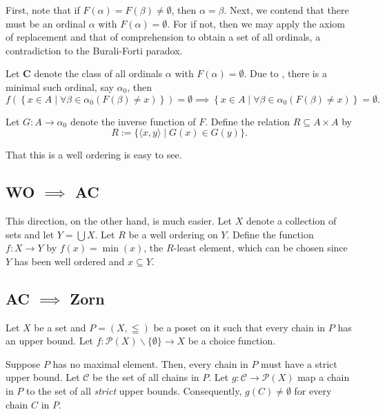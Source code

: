 First, note that if $F(\alpha) = F(\beta)\ne\emptyset$, then $\alpha = \beta$. Next, we contend that there must be an ordinal $\alpha$ with $F(\alpha) = \emptyset$. For if not, then we may apply the axiom of replacement and that of comprehension to obtain a set of all ordinals, a contradiction to the Burali-Forti paradox.

Let $\mathbf C$ denote the class of all ordinals $\alpha$ with $F(\alpha) = \emptyset$. Due to , there is a minimal such ordinal, say $\alpha_0$, then 
\begin{equation*}
    f\left(\left\{x\in A\mid\forall\beta\in\alpha_0(F(\beta)\ne x)\right\}\right) = \emptyset\implies\left\{x\in A\mid\forall\beta\in\alpha_0(F(\beta)\ne x)\right\} = \emptyset.
\end{equation*}

Let $G: A\to\alpha_0$ denote the inverse function of $F$. Define the relation $R\subseteq A\times A$ by 
\begin{equation*}
    R := \{\langle x,y\rangle\mid G(x)\in G(y)\}.
\end{equation*}

That this is a well ordering is easy to see.

\subsection*{WO \texorpdfstring{$\implies$}{} AC}

This direction, on the other hand, is much easier. Let $X$ denote a collection of sets and let $Y = \bigcup X$. Let $R$ be a well ordering on $Y$. Define the function $f: X\to Y$ by $f(x) = \min(x)$, the $R$-least element, which can be chosen since $Y$ has been well ordered and $x\subseteq Y$.

\subsection*{AC \texorpdfstring{$\implies$}{} Zorn}

Let $X$ be a set and $P = (X,\leqq)$ be a poset on it such that every chain in $P$ has an upper bound. Let $f: \mathscr P(X)\backslash\{\emptyset\}\to X$ be a choice function. 

Suppose $P$ has no maximal element. Then, every chain in $P$ must have a strict upper bound. Let $\mathscr C$ be the set of all chains in $P$. Let $g: \mathscr C\to\mathscr P(X)$ map a chain in $P$ to the set of all \emph{strict} upper bounds. Consequently, $g(C)\ne\emptyset$ for every chain $C$ in $P$.

